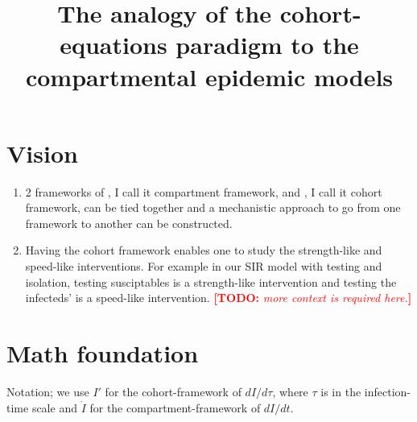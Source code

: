 \documentclass[12pt]{article}
\title{The analogy of the cohort-equations paradigm to the compartmental epidemic models}
\newcommand{\todo}[1]{\comment{red}{TODO}{#1}}
\DeclareRobustCommand\_{\ifmmode\expandafter\subtxt\else\textunderscore\fi}
\newcommand{\comment}{\showcomment}
\newcommand{\showcomment}[3]{\textcolor{#1}{\textbf{[#2: }\textsl{#3}\textbf{]}}}
\theoremstyle{definition} %
\begin{document}
\maketitle
\linenumbers
\section{Vision}
\begin{enumerate}
\item 2 frameworks of \cite{van2002reproduction}, I call it compartment framework, and \cite{champredon2018equivalence}, I call it cohort framework, can be tied together and a mechanistic approach to go from one framework to another can be constructed.

\item Having the cohort framework enables one to study the strength-like and speed-like interventions. For example in our SIR model with testing and isolation, testing susciptables is a strength-like intervention and testing the infecteds' is a speed-like intervention. \todo{more context is required here.}
\end{enumerate}

\section{Math foundation}
Notation; we use $I'$ for the cohort-framework of $dI/d\tau$, where $\tau$ is in the infection-time scale and $\dot I$ for the compartment-framework of $dI/dt$. 
\end{document}
